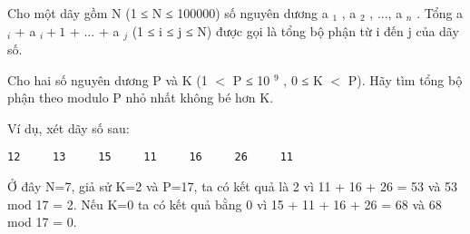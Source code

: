 Cho một dãy gồm N (1 ≤ N ≤ 100000) số nguyên dương a   $_    1   $   , a   $_    2   $   , ..., a   $_    n   $   . Tổng a   $_    i   $   + a   $_    i+1   $   + ... + a   $_    j   $   (1 ≤ i ≤ j ≤ N) được gọi là tổng bộ phận từ i đến j của dãy số.  

   Cho hai số nguyên dương P và K (1 $<$ P ≤ 10   $^    9   $   , 0 ≤ K $<$ P). Hãy tìm tổng bộ phận theo modulo P nhỏ nhất không bé hơn K.  

   Ví dụ, xét dãy số sau:  
\begin{verbatim}
12     13     15     11     16     26     11
\end{verbatim}

   Ở đây N=7, giả sử K=2 và P=17, ta có kết quả là 2 vì 11 + 16 + 26 = 53 và 53 mod 17 = 2. Nếu K=0 ta có kết quả bằng 0 vì 15 + 11 + 16 + 26 = 68 và 68 mod 17 = 0.  

\